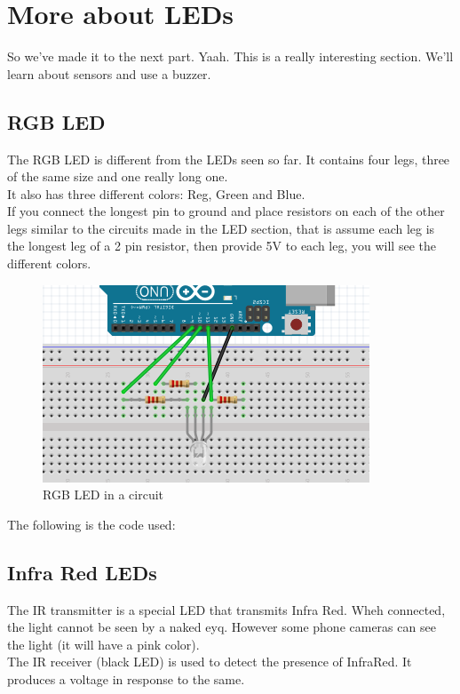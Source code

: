 \documentclass[14pt, oneside]{memoir}
\begin{document}
\chapter{More about LEDs}
So we've made it to the next part. Yaah. This is a really
interesting section. We'll learn about sensors and use a buzzer.

\section*{RGB LED}
The RGB LED is different from the LEDs seen so far. It contains
four legs, three of the same size and one really long one.
\\
It also has three different colors: Reg, Green and Blue.
\\
If you connect the longest pin to ground and place resistors on
each of the other legs similar to the circuits made in the LED
section, that is assume each leg is the longest leg of a 2 pin
resistor, then provide 5V to each leg, you will see the different
colors.
\\
\begin{figure}[H]
    \includegraphics[width=\linewidth]{circuit_images/rgb_led.png}
    \caption{RGB LED in a circuit}
\end{figure}

The following is the code used:



\section*{Infra Red LEDs}
The IR transmitter is a special LED that transmits Infra Red. Wheh
connected, the light cannot be seen by a naked eyq. However some
phone cameras can see the light (it will have a pink color).
\\
The IR receiver (black LED) is used to detect the presence of
InfraRed.
It produces a voltage in response to the same.
\end{document}
